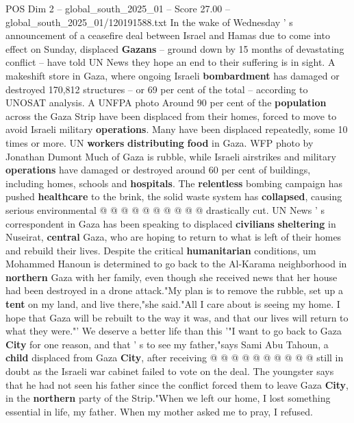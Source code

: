 \begin{textsample}{POS Dim 2 – global\_south\_2025\_01 – Score 27.00 – global\_south\_2025\_01/120191588.txt}  \label{ex:f2_pos_313}
In the wake of Wednesday ' s announcement of a ceasefire deal between Israel and Hamas due to come into effect on Sunday, displaced \textbf{Gazans} -- ground down by 15 months of devastating conflict -- have told UN News they hope an end to their suffering is in sight.
A makeshift store in Gaza, where ongoing Israeli \textbf{bombardment} has damaged or destroyed 170,812 structures -- or 69 per cent of the total -- according to UNOSAT analysis.
A UNFPA photo Around 90 per cent of the \textbf{population} across the Gaza Strip have been displaced from their homes, forced to move to avoid Israeli military \textbf{operations}.
Many have been displaced repeatedly, some 10 times or more.
UN \textbf{workers} \textbf{distributing} \textbf{food} in Gaza.
WFP photo by Jonathan Dumont Much of Gaza is rubble, while Israeli airstrikes and military \textbf{operations} have damaged or destroyed around 60 per cent of buildings, including homes, schools and \textbf{hospitals}.
The \textbf{relentless} bombing campaign has pushed \textbf{healthcare} to the brink, the solid waste system has \textbf{collapsed}, causing serious environmental @ @ @ @ @ @ @ @ @ @ drastically cut.
UN News ' s correspondent in Gaza has been speaking to displaced \textbf{civilians} \textbf{sheltering} in Nuseirat, \textbf{central} Gaza, who are hoping to return to what is left of their homes and rebuild their lives.
Despite the critical \textbf{humanitarian} conditions, um Mohammed Hanoun is determined to go back to the Al-Karama neighborhood in \textbf{northern} Gaza with her family, even though she received news that her house had been destroyed in a drone attack."My plan is to remove the rubble, set up a \textbf{tent} on my land, and live there,"she said."All I care about is seeing my home.
I hope that Gaza will be rebuilt to the way it was, and that our lives will return to what they were."' We deserve a better life than this '"I want to go back to Gaza \textbf{City} for one reason, and that ' s to see my father,"says Sami Abu Tahoun, a \textbf{child} displaced from Gaza \textbf{City}, after receiving @ @ @ @ @ @ @ @ @ @ still in doubt as the Israeli war cabinet failed to vote on the deal.
The youngster says that he had not seen his father since the conflict forced them to leave Gaza \textbf{City}, in the \textbf{northern} party of the Strip."When we left our home, I lost something essential in life, my father.
When my mother asked me to pray, I refused.

\end{textsample}
